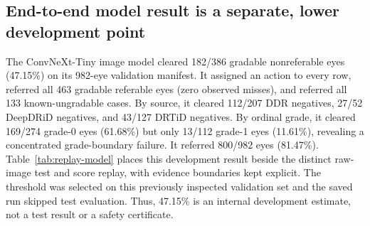 \documentclass[11pt]{article}
\begin{document}
\subsection{End-to-end model result is a separate, lower development point}
The ConvNeXt-Tiny image model cleared 182/386 gradable nonreferable eyes (47.15\%) on its 982-eye validation manifest. It assigned an action to every row, referred all 463 gradable referable eyes (zero observed misses), and referred all 133 known-ungradable cases. By source, it cleared 112/207 DDR negatives, 27/52 DeepDRiD negatives, and 43/127 DRTiD negatives. By ordinal grade, it cleared 169/274 grade-0 eyes (61.68\%) but only 13/112 grade-1 eyes (11.61\%), revealing a concentrated grade-boundary failure. It referred 800/982 eyes (81.47\%). Table~\ref{tab:replay-model} places this development result beside the distinct raw-image test and score replay, with evidence boundaries kept explicit. The threshold was selected on this previously inspected validation set and the saved run skipped test evaluation. Thus, 47.15\% is an internal development estimate, not a test result or a safety certificate.
\end{document}

